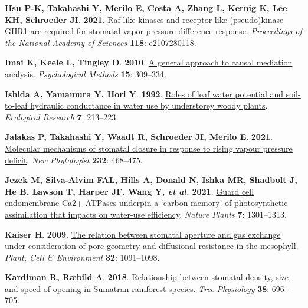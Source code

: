 \documentclass[
  letterpaper,
  DIV=11,
  numbers=noendperiod]{scrartcl}
\newlength{\cslhangindent}
\newenvironment{CSLReferences}[2] %
 {\begin{list}{}{%
  \setlength{\itemindent}{0pt}
  \setlength{\leftmargin}{0pt}
  \setlength{\parsep}{0pt}
  \ifodd #1
   \setlength{\leftmargin}{\cslhangindent}
   \setlength{\itemindent}{-1\cslhangindent}
  \fi
  \setlength{\itemsep}{#2\baselineskip}}}
 {\end{list}}
\begin{document}
\begin{CSLReferences}{0}{1}
\textbf{\textbf{Hsu P-K}, \textbf{Takahashi Y}, \textbf{Merilo E},
\textbf{Costa A}, \textbf{Zhang L}, \textbf{Kernig K}, \textbf{Lee KH},
\textbf{Schroeder JI}}. \textbf{2021}.
\href{https://doi.org/10.1073/pnas.2107280118}{Raf-like kinases and
receptor-like (pseudo)kinase {GHR1} are required for stomatal vapor
pressure difference response}. \emph{Proceedings of the National Academy
of Sciences} \textbf{118}: e2107280118.

\textbf{\textbf{Imai K}, \textbf{Keele L}, \textbf{Tingley D}}.
\textbf{2010}. \href{https://doi.org/10.1037/a0020761}{A general
approach to causal mediation analysis.} \emph{Psychological Methods}
\textbf{15}: 309--334.

\textbf{\textbf{Ishida A}, \textbf{Yamamura Y}, \textbf{Hori Y}}.
\textbf{1992}. \href{https://doi.org/10.1007/BF02347090}{Roles of leaf
water potential and soil-to-leaf hydraulic conductance in water use by
understorey woody plants}. \emph{Ecological Research} \textbf{7}:
213--223.

\textbf{\textbf{Jalakas P}, \textbf{Takahashi Y}, \textbf{Waadt R},
\textbf{Schroeder JI}, \textbf{Merilo E}}. \textbf{2021}.
\href{https://doi.org/10.1111/nph.17592}{Molecular mechanisms of
stomatal closure in response to rising vapour pressure deficit}.
\emph{New Phytologist} \textbf{232}: 468--475.

\textbf{\textbf{Jezek M}, \textbf{Silva-Alvim FAL}, \textbf{Hills A},
\textbf{Donald N}, \textbf{Ishka MR}, \textbf{Shadbolt J}, \textbf{He
B}, \textbf{Lawson T}, \textbf{Harper JF}, \textbf{Wang Y}, \emph{et
al.}} \textbf{2021}.
\href{https://doi.org/10.1038/s41477-021-00966-2}{Guard cell
endomembrane {Ca2}+-{ATPases} underpin a {`carbon memory'} of
photosynthetic assimilation that impacts on water-use efficiency}.
\emph{Nature Plants} \textbf{7}: 1301--1313.

\textbf{\textbf{Kaiser H}}. \textbf{2009}.
\href{https://doi.org/10.1111/j.1365-3040.2009.01990.x}{The relation
between stomatal aperture and gas exchange under consideration of pore
geometry and diffusional resistance in the mesophyll}. \emph{Plant, Cell
\& Environment} \textbf{32}: 1091--1098.

\textbf{\textbf{Kardiman R}, \textbf{Ræbild A}}. \textbf{2018}.
\href{https://doi.org/10.1093/treephys/tpx149}{Relationship between
stomatal density, size and speed of opening in {Sumatran} rainforest
species}. \emph{Tree Physiology} \textbf{38}: 696--705.


\end{CSLReferences}
\end{document}
